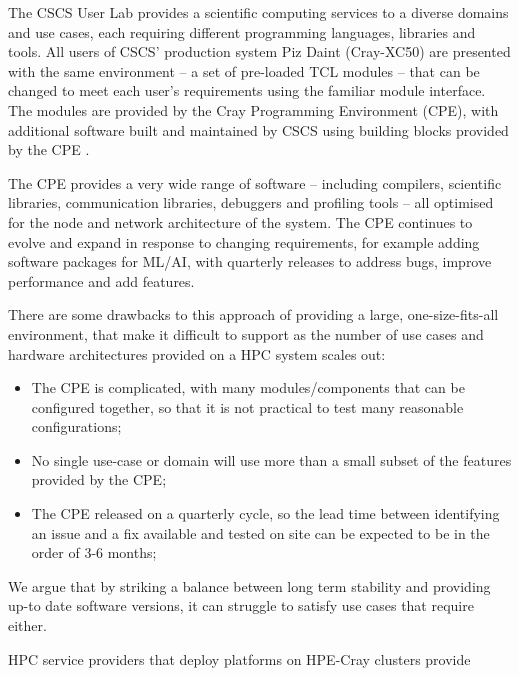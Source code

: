 
The CSCS User Lab provides a scientific computing services to a diverse domains and use cases, each requiring different programming languages, libraries and tools.
All users of CSCS' production system Piz Daint (Cray-XC50) are presented with the same environment -- a set of pre-loaded TCL modules -- that can be changed to meet each user's requirements using the familiar module interface.
The modules are provided by the Cray Programming Environment (CPE), with additional software built and maintained by CSCS using building blocks provided by the CPE .

The CPE provides a very wide range of software -- including compilers, scientific libraries, communication libraries, debuggers and profiling tools -- all optimised for the node and network architecture of the system.
The CPE continues to evolve and expand in response to changing requirements, for example adding software packages for ML/AI, with quarterly releases to address bugs, improve performance and add features.

There are some drawbacks to this approach of providing a large, one-size-fits-all environment, that make it difficult to support as the number of use cases and hardware architectures provided on a HPC system scales out:
\begin{itemize}
    \item The CPE is complicated, with many modules/components that can be configured together, so that it is not practical to test many reasonable configurations;
    \item No single use-case or domain will use more than a small subset of the features provided by the CPE;
    \item The CPE released on a quarterly cycle, so the lead time between identifying an issue and a fix available and tested on site can be expected to be in the order of 3-6 months;
\end{itemize}
We argue that by striking a balance between long term stability and providing up-to date software versions, it can struggle to satisfy use cases that require either.

HPC service providers that deploy platforms on HPE-Cray clusters provide

